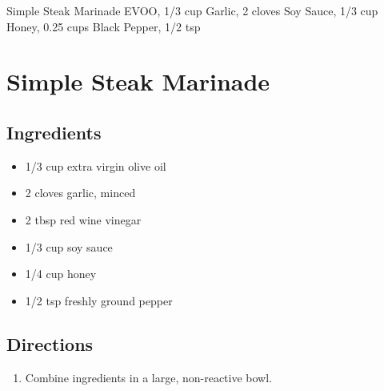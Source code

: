 Simple Steak Marinade
  EVOO, 1/3 cup
  Garlic, 2 cloves
  Soy Sauce, 1/3 cup
  Honey, 0.25 cups
  Black Pepper, 1/2 tsp

\section{ Simple Steak Marinade }

\subsection{ Ingredients }

\begin{itemize}
  \item 1/3 cup extra virgin olive oil
  \item 2 cloves garlic, minced
  \item 2 tbsp red wine vinegar
  \item 1/3 cup soy sauce
  \item 1/4 cup honey
  \item 1/2 tsp freshly ground pepper
\end{itemize}

\subsection{ Directions }

\begin{enumerate}
  \item Combine ingredients in a large, non-reactive bowl. 
\end{enumerate}
